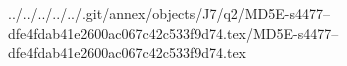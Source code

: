 ../../../../../.git/annex/objects/J7/q2/MD5E-s4477--dfe4fdab41e2600ac067c42c533f9d74.tex/MD5E-s4477--dfe4fdab41e2600ac067c42c533f9d74.tex